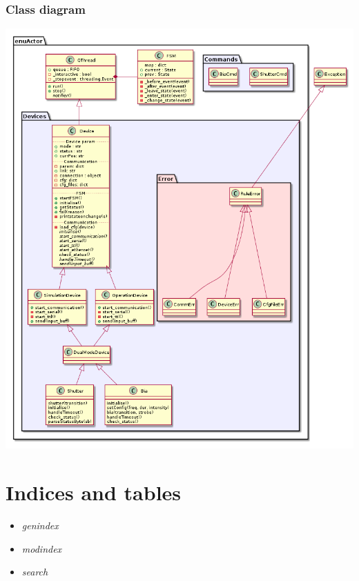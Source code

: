 \documentclass[letterpaper,10pt,english]{sphinxmanual}
\begin{document}
\subsection{Class diagram}
\label{enuActor:class-diagram}
{\hfill\includegraphics{../../diagram_class.png}\hfill}


\chapter{Indices and tables}
\label{index:indices-and-tables}\begin{itemize}
\item {} 
\emph{genindex}

\item {} 
\emph{modindex}

\item {} 
\emph{search}

\end{itemize}
\end{document}
